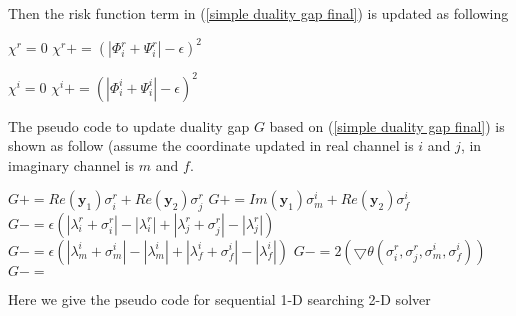 \documentclass[12pt, draftclsnofoot, onecolumn]{IEEEtran}
\begin{document}
\begin{spacing}{2}
Then the risk function term in (\ref{simple duality gap final}) is updated as following
\begin{algorithm}[htb]
\begin{algorithmic}
\State $\chi^{r}=0$  
\State $\chi^{r}+=(|\Phi^{r}_{i}+\Psi^{r}_{i}|-\epsilon)^{2}$
\EndIf
\EndFor
\EndProcedure
\end{algorithmic}
\end{algorithm}

\begin{algorithm}[htb]
\begin{algorithmic}
\State $\chi^{i}=0$  
\State $\chi^{i}+=(|\Phi^{i}_{i}+\Psi^{i}_{i}|-\epsilon)^{2}$
\EndIf
\EndFor
\EndProcedure
\end{algorithmic}
\end{algorithm}
The pseudo code to update duality gap $G$ based on (\ref{simple duality gap final}) is shown as follow (assume the coordinate updated in real channel is $i$ and $j$, in imaginary channel is $m$ and $f$.
\begin{algorithm}[htb]
\begin{algorithmic}
\State $G+=Re(\mathbf{y}_{1})\sigma^{r}_{i}+Re(\mathbf{y}_{2})\sigma^{r}_{j}$
\State $G+=Im(\mathbf{y}_{1})\sigma^{i}_{m}+Re(\mathbf{y}_{2})\sigma^{i}_{f}$
\State $G-=\epsilon(|\lambda^{r}_{i}+\sigma^{r}_{i}|-|\lambda^{r}_{i}|+|\lambda^{r}_{j}+\sigma^{r}_{j}|-|\lambda^{r}_{j}|)$
\State $G-=\epsilon(|\lambda^{i}_{m}+\sigma^{i}_{m}|-|\lambda^{i}_{m}|+|\lambda^{i}_{f}+\sigma^{i}_{f}|-|\lambda^{i}_{f}|)$
\State $G-=2(\bigtriangledown \theta(\sigma^{r}_{i},\sigma^{r}_{j},\sigma^{i}_{m},\sigma^{i}_{f}))$
\State $G-=$
\EndProcedure
\label{update G Phi and Psi}
\end{algorithmic}
\end{algorithm}


Here we give the pseudo code for sequential 1-D searching 2-D solver


\end{spacing}
\end{document}
